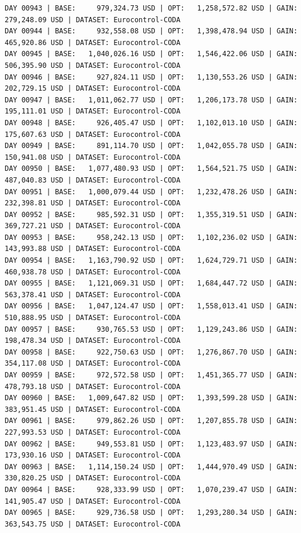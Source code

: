 \documentclass[11pt,a4paper]{article}
\begin{document}
\begin{verbatim}
DAY 00943 | BASE:     979,324.73 USD | OPT:   1,258,572.82 USD | GAIN: 279,248.09 USD | DATASET: Eurocontrol-CODA
DAY 00944 | BASE:     932,558.08 USD | OPT:   1,398,478.94 USD | GAIN: 465,920.86 USD | DATASET: Eurocontrol-CODA
DAY 00945 | BASE:   1,040,026.16 USD | OPT:   1,546,422.06 USD | GAIN: 506,395.90 USD | DATASET: Eurocontrol-CODA
DAY 00946 | BASE:     927,824.11 USD | OPT:   1,130,553.26 USD | GAIN: 202,729.15 USD | DATASET: Eurocontrol-CODA
DAY 00947 | BASE:   1,011,062.77 USD | OPT:   1,206,173.78 USD | GAIN: 195,111.01 USD | DATASET: Eurocontrol-CODA
DAY 00948 | BASE:     926,405.47 USD | OPT:   1,102,013.10 USD | GAIN: 175,607.63 USD | DATASET: Eurocontrol-CODA
DAY 00949 | BASE:     891,114.70 USD | OPT:   1,042,055.78 USD | GAIN: 150,941.08 USD | DATASET: Eurocontrol-CODA
DAY 00950 | BASE:   1,077,480.93 USD | OPT:   1,564,521.75 USD | GAIN: 487,040.83 USD | DATASET: Eurocontrol-CODA
DAY 00951 | BASE:   1,000,079.44 USD | OPT:   1,232,478.26 USD | GAIN: 232,398.81 USD | DATASET: Eurocontrol-CODA
DAY 00952 | BASE:     985,592.31 USD | OPT:   1,355,319.51 USD | GAIN: 369,727.21 USD | DATASET: Eurocontrol-CODA
DAY 00953 | BASE:     958,242.13 USD | OPT:   1,102,236.02 USD | GAIN: 143,993.88 USD | DATASET: Eurocontrol-CODA
DAY 00954 | BASE:   1,163,790.92 USD | OPT:   1,624,729.71 USD | GAIN: 460,938.78 USD | DATASET: Eurocontrol-CODA
DAY 00955 | BASE:   1,121,069.31 USD | OPT:   1,684,447.72 USD | GAIN: 563,378.41 USD | DATASET: Eurocontrol-CODA
DAY 00956 | BASE:   1,047,124.47 USD | OPT:   1,558,013.41 USD | GAIN: 510,888.95 USD | DATASET: Eurocontrol-CODA
DAY 00957 | BASE:     930,765.53 USD | OPT:   1,129,243.86 USD | GAIN: 198,478.34 USD | DATASET: Eurocontrol-CODA
DAY 00958 | BASE:     922,750.63 USD | OPT:   1,276,867.70 USD | GAIN: 354,117.08 USD | DATASET: Eurocontrol-CODA
DAY 00959 | BASE:     972,572.58 USD | OPT:   1,451,365.77 USD | GAIN: 478,793.18 USD | DATASET: Eurocontrol-CODA
DAY 00960 | BASE:   1,009,647.82 USD | OPT:   1,393,599.28 USD | GAIN: 383,951.45 USD | DATASET: Eurocontrol-CODA
DAY 00961 | BASE:     979,862.26 USD | OPT:   1,207,855.78 USD | GAIN: 227,993.53 USD | DATASET: Eurocontrol-CODA
DAY 00962 | BASE:     949,553.81 USD | OPT:   1,123,483.97 USD | GAIN: 173,930.16 USD | DATASET: Eurocontrol-CODA
DAY 00963 | BASE:   1,114,150.24 USD | OPT:   1,444,970.49 USD | GAIN: 330,820.25 USD | DATASET: Eurocontrol-CODA
DAY 00964 | BASE:     928,333.99 USD | OPT:   1,070,239.47 USD | GAIN: 141,905.47 USD | DATASET: Eurocontrol-CODA
DAY 00965 | BASE:     929,736.58 USD | OPT:   1,293,280.34 USD | GAIN: 363,543.75 USD | DATASET: Eurocontrol-CODA

\end{verbatim}
\end{document}

